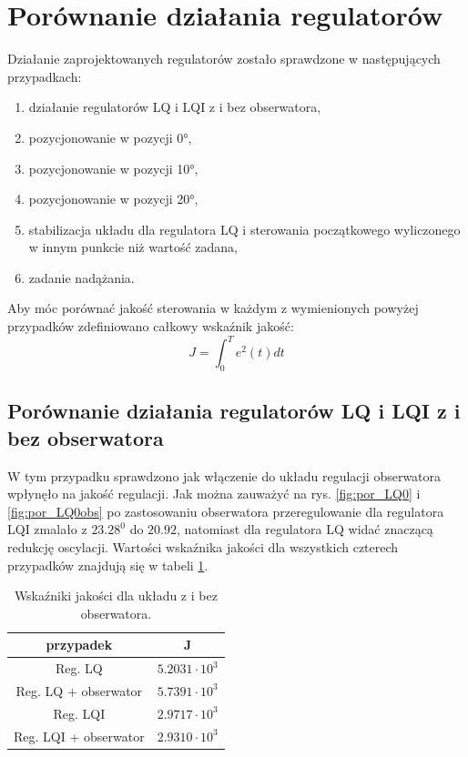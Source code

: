 \documentclass[11pt,a4paper]{article}
\begin{document}
\newpage
\section{Porównanie działania regulatorów}

Działanie zaprojektowanych regulatorów zostało sprawdzone w następujących przypadkach: 
\begin{enumerate}
	\item działanie regulatorów LQ i LQI z i bez obserwatora,
	\item pozycjonowanie w pozycji \ang{0},
	\item pozycjonowanie w pozycji \ang{10},
	\item pozycjonowanie w pozycji \ang{20},
	\item stabilizacja układu dla regulatora LQ i sterowania początkowego wyliczonego w innym punkcie niż wartość zadana,
	\item zadanie nadążania.
\end{enumerate}
Aby móc porównać jakość sterowania w każdym z wymienionych powyżej przypadków zdefiniowano całkowy wskaźnik jakość:
\begin{equation}\label{key}
J =\int_{0}^{T} e^2(t) dt
\end{equation}

\subsection{Porównanie działania regulatorów LQ i LQI z i bez obserwatora}
W tym przypadku sprawdzono jak włączenie do układu regulacji obserwatora wpłynęło na jakość regulacji. Jak można zauważyć na rys. \ref{fig:por_LQ0} i \ref{fig:por_LQ0obs} po zastosowaniu obserwatora przeregulowanie dla regulatora LQI zmalało z $23.28 ^0$ do $ 20.92$, natomiast dla regulatora LQ widać znaczącą redukcję oscylacji. Wartości wskaźnika jakości dla wszystkich czterech przypadków znajdują się w tabeli \ref{obs_por_tab}.

\begin{table}[ht]
	\caption{Wskaźniki jakości dla układu z i bez obserwatora.}
	\label{obs_por_tab}
	\centering
	
	\begin{tabular}{|c|c|}
		\hline
		przypadek &J\\
		\hline
		Reg. LQ & $5.2031\cdot 10 ^3$\\
		\hline
		Reg. LQ + obserwator & $5.7391 \cdot 10 ^3$\\
		\hline
		Reg. LQI & $2.9717 \cdot 10 ^3$\\
		\hline
		Reg. LQI + obserwator & $2.9310 \cdot 10 ^3$\\ 
		\hline
	\end{tabular}
\end{table}
\end{document}
